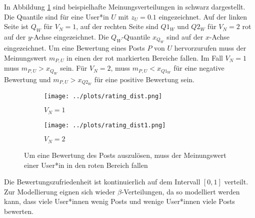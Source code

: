 In Abbildung \ref{fig:bewzuf} sind beispielhafte Meinungsverteilungen in schwarz dargestellt. Die Quantile sind für eine User*in $U$ mit $z_U = 0.1$ eingezeichnet. Auf der linken Seite ist $Q_W$ für $V_N = 1$, auf der rechten Seite sind $Q1_W$ und $Q2_W$ für $V_N = 2$ rot auf der $y$-Achse eingezeichnet. Die $Q_W$-Quantile $x_{Q_W}$ sind auf der $x$-Achse eingezeichnet. Um eine Bewertung eines Posts $P$ von $U$ hervorzurufen muss der Meinungswert $m_{P,U}$ in einen der rot markierten Bereiche fallen. Im Fall $V_N = 1$ muss $m_{P,U} > x_{Q_W}$ sein. Für $V_N = 2$, muss $m_{P,U} < x_{Q1_W}$ für eine negative Bewertung und $m_{P,U} > x_{Q2_W}$ für eine positive Bewertung sein.

\begin{figure}
	\begin{subfigure}{0.5\textwidth}
		\texttt{[image: ../plots/rating\_dist.png]}
		\caption{$V_N = 1$}
	\end{subfigure}
	\begin{subfigure}{0.5\textwidth}
		\texttt{[image: ../plots/rating\_dist1.png]}
		\caption{$V_N = 2$}
	\end{subfigure}
	\caption{Um eine Bewertung des Posts auszulösen, muss der Meinungswert einer User*in in den roten Bereich fallen}
	\label{fig:bewzuf}
\end{figure}


Die Bewertungszufriedenheit ist kontinuierlich auf dem Intervall $[0,1]$ verteilt. Zur Modellierung eignen sich wieder $\beta$-Verteilungen, da so modelliert werden kann, dass viele User*innen wenig Posts und wenige User*innen viele Posts bewerten.






